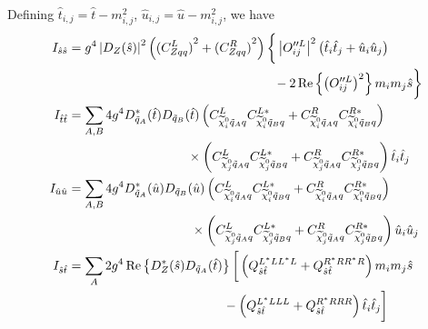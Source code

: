 \documentclass[english,notitlepage]{article}
\begin{document}
    Defining \(\hat{t}_{i, j} = \hat{t} - m_{i, j}^2\), \(\hat{u}_{i, j} = \hat{u} - m_{i, j}^2\), we have
    \begin{subequations}
        \begin{align}
            \nonumber
            I_{\hat{s}\hat{s}} & = g^4 \abs{D_Z(\hat{s})}^2 \pclosed{{(C_{Zqq}^L)}^2+{(C_{Zqq}^R)}^2} \bigg\{ \abs{O_{ij}^{\prime\prime L}}^2 \pclosed{\hat{t}_i\hat{t}_j + \hat{u}_i\hat{u}_j}                                               \\
                               & \hspace{5.7cm} - 2\Re{\pclosed{O_{ij}^{\prime\prime L}}^2} m_i m_j \hat{s} \bigg\}                                                                                                                                         \\
            \nonumber
            I_{\hat{t}\hat{t}} & = \sum_{A, B} 4 g^4 D^\ast_{\tilde{q}_A}(\hat{t}) D_{\tilde{q}_B}(\hat{t}) \pclosed{C_{\nino[i] \tilde{q}_A q}^{L} C_{\nino[i] \tilde{q}_B q}^{L\ast} + C_{\nino[i] \tilde{q}_A q}^{R} C_{\nino[i] \tilde{q}_B q}^{R\ast}} \\
                               & \hspace{3.3cm} \times \pclosed{C_{\nino[j] \tilde{q}_A q}^{L} C_{\nino[j] \tilde{q}_B q}^{L\ast} + C_{\nino[j] \tilde{q}_A q}^{R} C_{\nino[j] \tilde{q}_B q}^{R\ast}} \hat{t}_i \hat{t}_j                                  \\
            \nonumber
            I_{\hat{u}\hat{u}} & = \sum_{A, B} 4 g^4 D^\ast_{\tilde{q}_A}(\hat{u}) D_{\tilde{q}_B}(\hat{u}) \pclosed{C_{\nino[i] \tilde{q}_A q}^{L} C_{\nino[i] \tilde{q}_B q}^{L\ast} + C_{\nino[i] \tilde{q}_A q}^{R} C_{\nino[i] \tilde{q}_B q}^{R\ast}} \\
                               & \hspace{3.4cm} \times \pclosed{C_{\nino[j] \tilde{q}_A q}^{L} C_{\nino[j] \tilde{q}_B q}^{L\ast} + C_{\nino[j] \tilde{q}_A q}^{R} C_{\nino[j] \tilde{q}_B q}^{R\ast}} \hat{u}_i \hat{u}_j                                  \\
            \nonumber
            I_{\hat{s}\hat{t}} & = \sum_{A} 2 g^4 \Re{D^\ast_{Z}(\hat{s}) D_{\tilde{q}_A}(\hat{t})} \bigg[\pclosed{Q_{\hat{s}\hat{t}}^{L^\ast L L^\ast L} + Q_{\hat{s}\hat{t}}^{R^\ast R R^\ast R}} m_im_j \hat{s}                            \\
                               & \hspace{4.3cm} - \pclosed{Q_{\hat{s}\hat{t}}^{L^\ast L L L} + Q_{\hat{s}\hat{t}}^{R^\ast R R R}} \hat{t}_i\hat{t}_j\bigg]                                                                                                  \\

\end{align}
\end{subequations}
\end{document}
